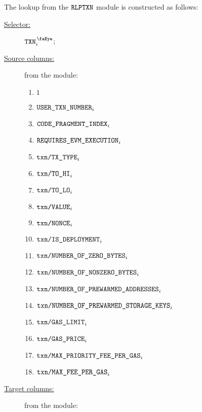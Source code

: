 The lookup from the $\texttt{RLPTXN}$ module is constructed as follows:
\begin{description}
	\item[\underline{Selector:}] $\isTxn _{i}$;
	\item[\underline{Source columns:}] from the \rlpTxnMod{} module:
		\begin{multicols}{3}
			\begin{enumerate}
				\item $1$
				\item $\texttt{USER}\texttt{\_}\texttt{TXN\_NUMBER}                       _{i}$
				\item $\texttt{CODE\_FRAGMENT\_INDEX}                                         _{i}$
				\item $\texttt{REQUIRES\_EVM\_EXECUTION}      _{i}$
				\item $\texttt{txn}\texttt{/}\texttt{{TX\_TYPE}}               _{i}$
				\item $\texttt{txn}\texttt{/}\texttt{{TO\_HI}}                 _{i}$
				\item $\texttt{txn}\texttt{/}\texttt{{TO\_LO}}                 _{i}$
				\item $\texttt{txn}\texttt{/}\texttt{{VALUE}}             _{i}$
				\item $\texttt{txn}\texttt{/}\texttt{{\texttt{NONCE}}}                _{i}$
				\item $\texttt{txn}\texttt{/}\texttt{{IS\_DEPLOYMENT}}                _{i}$
				\item $\texttt{txn}\texttt{/}\texttt{{NUMBER\_OF\_ZERO\_BYTES}}         _{i}$
				\item $\texttt{txn}\texttt{/}\texttt{{NUMBER\_OF\_NONZERO\_BYTES}}      _{i}$
				\item $\texttt{txn}\texttt{/}\texttt{{NUMBER\_OF\_PREWARMED\_ADDRESSES}}      _{i}$
				\item $\texttt{txn}\texttt{/}\texttt{{NUMBER\_OF\_PREWARMED\_STORAGE\_KEYS}}   _{i}$
				\item $\texttt{txn}\texttt{/}\texttt{{GAS\_LIMIT}}             _{i}$
				\item $\texttt{txn}\texttt{/}\texttt{{GAS\_PRICE}}             _{i}$
				\item $\texttt{txn}\texttt{/}\texttt{{MAX\_PRIORITY\_FEE\_PER\_GAS}} _{i}$
				\item $\texttt{txn}\texttt{/}\texttt{{MAX\_FEE\_PER\_GAS}}         _{i}$
			\end{enumerate}
		\end{multicols}
	\item[\underline{Target columns:}] from the \userTxnDataMod{} module: 
		\begin{multicols}{2}

\end{multicols}
\end{description}
